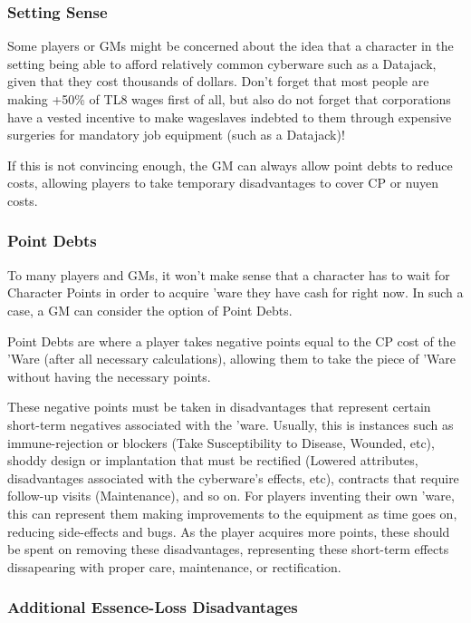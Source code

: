 \begin{multicols*}{3}
	\subsubsection{Setting Sense}
	
	Some players or GMs might be concerned about the idea that a character in the setting being able to afford relatively common cyberware such as a Datajack, given that they cost thousands of dollars. Don't forget that most people are making +50\% of TL8 wages first of all, but also do not forget that corporations have a vested incentive to make wageslaves indebted to them through expensive surgeries for mandatory job equipment (such as a Datajack)! 
	
	If this is not convincing enough, the GM can always allow point debts to reduce costs, allowing players to take temporary disadvantages to cover CP or nuyen costs.
	
	\subsubsection{Point Debts}
	
	To many players and GMs, it won't make sense that a character has to wait for Character Points in order to acquire 'ware they have cash for right now. In such a case, a GM can consider the option of Point Debts.
	
	Point Debts are where a player takes negative points equal to the CP cost of the 'Ware (after all necessary calculations), allowing them to take the piece of 'Ware without having the necessary points. 
	
	These negative points must be taken in disadvantages that represent certain short-term negatives associated with the 'ware. Usually, this is instances such as immune-rejection or blockers (Take Susceptibility to Disease, Wounded, etc), shoddy design or implantation that must be rectified (Lowered attributes, disadvantages associated with the cyberware's effects, etc), contracts that require follow-up visits (Maintenance), and so on. For players inventing their own 'ware, this can represent them making improvements to the equipment as time goes on, reducing side-effects and bugs. As the player acquires more points, these should be spent on removing these disadvantages, representing these short-term effects dissapearing with proper care, maintenance, or rectification.
	
	\subsubsection{Additional Essence-Loss Disadvantages}
	

\end{multicols*}
